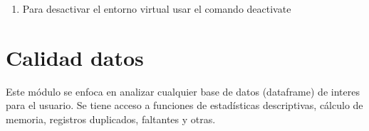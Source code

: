 \documentclass[letterpaper,10pt,openany,spanish]{sphinxmanual}
\begin{document}
\begin{enumerate}
\begin{quote}
\begin{sphinxVerbatim}[commandchars=\\\{\}]
\end{sphinxVerbatim}
\end{quote}

\item {} 
Para desactivar el entorno virtual usar el comando deactivate
\begin{quote}

\begin{sphinxVerbatim}[commandchars=\\\{\}]
\end{sphinxVerbatim}
\end{quote}

\end{enumerate}


\chapter{Calidad datos}
\label{\detokenize{calidad_datos:calidad-datos}}\label{\detokenize{calidad_datos:id1}}\label{\detokenize{calidad_datos::doc}}
Este módulo se enfoca en analizar cualquier base de datos (dataframe) de interes para el usuario. Se tiene acceso a funciones de estadísticas descriptivas, cálculo de memoria, registros duplicados, faltantes y otras.

\label{\detokenize{calidad_datos:module-calidad_datos}}
\end{document}
